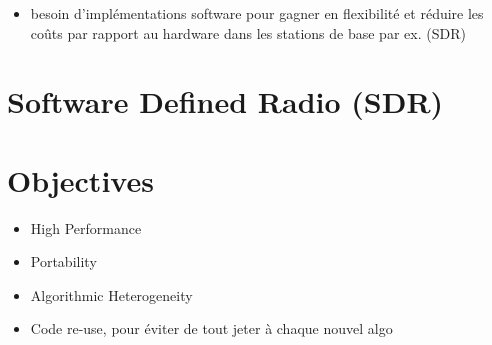 \begin{itemize}
  \item besoin d'implémentations software pour gagner en flexibilité et réduire
    les coûts par rapport au hardware dans les stations de base par ex. (SDR)
\end{itemize}

\section{Software Defined Radio (SDR)}

\section{Objectives}

\begin{itemize}
  \item High Performance
  \item Portability
  \item Algorithmic Heterogeneity
  \item Code re-use, pour éviter de tout jeter à chaque nouvel algo
\end{itemize}
